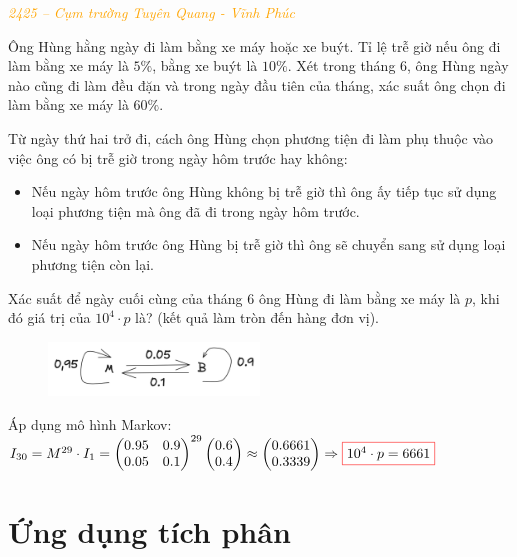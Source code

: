 \documentclass[twoside,final]{hcmut-report}
\newcommand{\exercise}[1]{\begin{exercisebox}#1\end{exercisebox}}
\newcommand{\result}[1]{\fcolorbox{red}{white}{#1}}
\begin{document}
\exercise{
    \textcolor{orange}{\textit{2425 -- Cụm trường Tuyên Quang - Vĩnh Phúc}}

    Ông Hùng hằng ngày đi làm bằng xe máy hoặc xe buýt. Tỉ lệ trễ giờ nếu ông đi làm bằng xe máy là $5\%$, bằng xe buýt là $10\%$. Xét trong tháng 6, ông Hùng ngày nào cũng đi làm đều đặn và trong ngày đầu tiên của tháng, xác suất ông chọn đi làm bằng xe máy là $60\%$.

    Từ ngày thứ hai trở đi, cách ông Hùng chọn phương tiện đi làm phụ thuộc vào việc ông có bị trễ giờ trong ngày hôm trước hay không:
    \begin{itemize}[itemsep=0pt, topsep=0pt, parsep=0pt,label=-]
        \item Nếu ngày hôm trước ông Hùng không bị trễ giờ thì ông ấy tiếp tục sử dụng loại phương tiện mà ông đã đi trong ngày hôm trước.
        \item Nếu ngày hôm trước ông Hùng bị trễ giờ thì ông sẽ chuyển sang sử dụng loại phương tiện còn lại.
    \end{itemize}

    Xác suất để ngày cuối cùng của tháng 6 ông Hùng đi làm bằng xe máy là $p$, khi đó giá trị của $10^4\cdot p$ là? (kết quả làm tròn đến hàng đơn vị).
}
\begin{figure}[H]
    \centering
    \includegraphics*[width=0.5\textwidth]{images/XSTK/TQ-VP.png}
\end{figure}
Áp dụng mô hình Markov: $I_{30} = M^{29}\cdot I_1 = \begin{pmatrix}
        0.95 & 0.9 \\
        0.05 & 0.1
    \end{pmatrix}^{29} \begin{pmatrix}
        0.6 \\ 0.4
    \end{pmatrix} \approx \begin{pmatrix}
        0.6661 \\0.3339
    \end{pmatrix} \Rightarrow \result{$10^4\cdot p = 6661$}$
\newpage\section{Ứng dụng tích phân}
\end{document}

